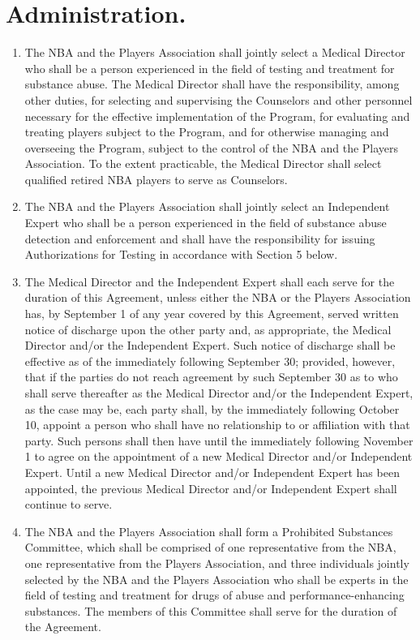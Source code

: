 \documentclass[
]{book}
\providecommand{\tightlist}{%
  \setlength{\itemsep}{0pt}\setlength{\parskip}{0pt}}
\begin{document}
\hypertarget{administration.}{%
\section{Administration.}\label{administration.}}

\begin{enumerate}
\def\labelenumi{(\alph{enumi})}
\tightlist
\item
  The NBA and the Players Association shall jointly select a Medical Director who shall be a person experienced in the field of testing and treatment for substance abuse. The Medical Director shall have the responsibility, among other duties, for selecting and supervising the Counselors and other personnel necessary for the effective implementation of the Program, for evaluating and treating players subject to the Program, and for otherwise managing and overseeing the Program, subject to the control of the NBA and the Players Association. To the extent practicable, the Medical Director shall select qualified retired NBA players to serve as Counselors.
\item
  The NBA and the Players Association shall jointly select an Independent Expert who shall be a person experienced in the field of substance abuse detection and enforcement and shall have the responsibility for issuing Authorizations for Testing in accordance with Section 5 below.
\item
  The Medical Director and the Independent Expert shall each serve for the duration of this Agreement, unless either the NBA or the Players Association has, by September 1 of any year covered by this Agreement, served written notice of discharge upon the other party and, as appropriate, the Medical Director and/or the Independent Expert. Such notice of discharge shall be effective as of the immediately following September 30; provided, however, that if the parties do not reach agreement by such September 30 as to who shall serve thereafter as the Medical Director and/or the Independent Expert, as the case may be, each party shall, by the immediately following October 10, appoint a person who shall have no relationship to or affiliation with that party. Such persons shall then have until the immediately following November 1 to agree on the appointment of a new Medical Director and/or Independent Expert. Until a new Medical Director and/or Independent Expert has been appointed, the previous Medical Director and/or Independent Expert shall continue to serve.
\item
  The NBA and the Players Association shall form a Prohibited Substances Committee, which shall be comprised of one representative from the NBA, one representative from the Players Association, and three individuals jointly selected by the NBA and the Players Association who shall be experts in the field of testing and treatment for drugs of abuse and performance-enhancing substances. The members of this Committee shall serve for the duration of the Agreement.

\end{enumerate}
\end{document}
